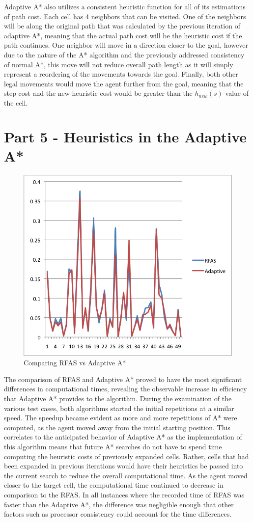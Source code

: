 \documentclass[12pt]{article}
\begin{document}
		Adaptive A* also utilizes a consistent heuristic function for all of its estimations of path cost.  Each cell has 4 neighbors that can be visited.  One of the neighbors will be along the original path that was calculated by the previous iteration of adaptive A*, meaning that the actual path cost will be the heuristic cost if the path continues.  One neighbor will move in a direction closer to the goal, however due to the nature of the A* algorithm and the previously addressed consistency of normal A*, this move will not reduce overall path length as it will simply represent a reordering of the movements towards the goal.  Finally, both other legal movements would move the agent further from the goal, meaning that the step cost and the new heuristic cost would be greater than the $h_{new}(s)$ value of the cell.  
		
	\section*{Part 5 - Heuristics in the Adaptive A*}
		\begin{figure}[!htb]
			\centering
			\includegraphics[width=.5\textwidth]{foward_adaptive.png}
			\caption{Comparing RFAS vs Adaptive A*}
		\end{figure}
		The comparison of RFAS and Adaptive A* proved to have the most significant differences in computational times, revealing the observable increase in efficiency that Adaptive A* provides to the algorithm.  During the examination of the various test cases, both algorithms started the initial repetitions at a similar speed.  The speedup became evident as more and more repetitions of A* were computed, as the agent moved away from the initial starting position.  This correlates to the anticipated behavior of Adaptive A* as the implementation of this algorithm means that future A* searches do not have to spend time computing the heuristic costs of previously expanded cells.  Rather, cells that had been expanded in previous iterations would have their heuristics be passed into the current search to reduce the overall computational time.  As the agent moved closer to the target cell, the computational time continued to decrease in comparison to the RFAS.  In all instances where the recorded time of RFAS was faster than the Adaptive A*, the difference was negligible enough that other factors such as processor consistency could account for the time differences.  
\end{document}
